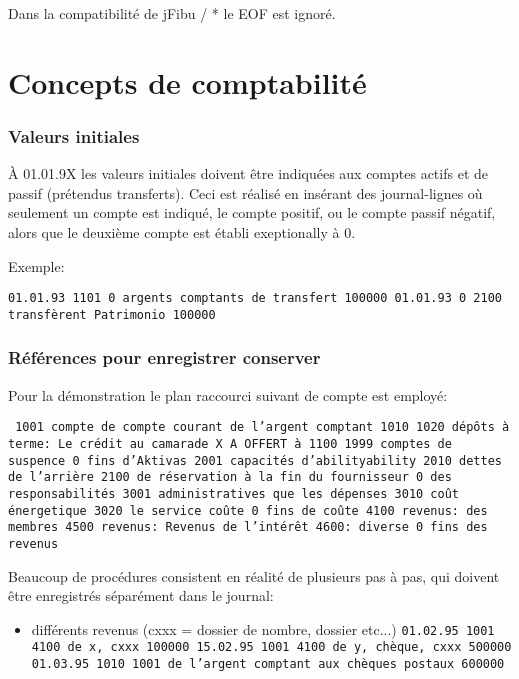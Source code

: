\documentclass[12pt]{report}
\begin{document}
\begin{appendix}
 Dans la compatibilité de jFibu / * le EOF est ignoré. 


\chapter{Concepts de comptabilité}
\subsection{ Valeurs initiales}

 À 01.01.9X les valeurs initiales doivent être indiquées aux comptes actifs et de passif (prétendus transferts).  Ceci est réalisé en insérant des journal-lignes où seulement un compte est indiqué, le compte positif, ou le compte passif négatif, alors que le deuxième compte est établi exeptionally à 0.

 Exemple:

 {\tt  01.01.93 1101 0 argents comptants de transfert 100000 01.01.93 0 2100 transfèrent Patrimonio 100000 }



\subsection{ Références pour enregistrer conserver
}

 Pour la démonstration le plan raccourci suivant de compte est employé:

{\tt  
1001 compte de compte courant de l'argent comptant 1010 1020 dépôts à terme:  Le crédit au camarade X A OFFERT à 1100 1999 comptes de suspence 0 fins d'Aktivas 2001 capacités d'abilityability 2010 dettes de l'arrière 2100 de réservation à la fin du fournisseur 0 des responsabilités 3001 administratives que les dépenses 3010 coût énergetique 3020 le service coûte 0 fins de coûte 4100 revenus:  des membres 4500 revenus:  Revenus de l'intérêt 4600:  diverse 0 fins des revenus }

 Beaucoup de procédures consistent en réalité de plusieurs pas à pas, qui doivent être enregistrés séparément dans le journal:



\begin{itemize}
\item différents revenus (cxxx = dossier de nombre, dossier etc...)  {\tt  01.02.95 1001 4100 de x, cxxx 100000 15.02.95 1001 4100 de y, chèque, cxxx 500000 01.03.95 1010 1001 de l'argent comptant aux chèques postaux 600000 }




\end{itemize}
\end{appendix}
\end{document}
